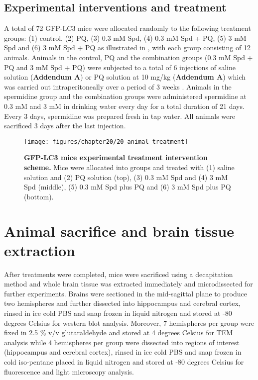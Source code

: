 \subsection{Experimental interventions and treatment}
A total of 72 GFP-LC3 mice were allocated randomly to the following treatment groups: (1) control, (2) PQ, (3) 0.3 mM Spd, (4) 0.3 mM Spd + PQ, (5) 3 mM Spd and (6) 3 mM Spd + PQ as illustrated in  , with each group consisting of 12 animals. Animals in the control, PQ and the combination groups (0.3 mM Spd + PQ and 3 mM Spd + PQ) were subjected to a total of 6 injections of saline solution (\textbf{Addendum A}) or PQ solution at 10 mg/kg (\textbf{Addendum A}) which was carried out intraperitoneally over a period of 3 weeks \citep{Chen2012}. Animals in the spermidine group and the combination groups were administered spermidine at 0.3 mM and 3 mM in drinking water every day for a total duration of 21 days. Every 3 days, spermidine was prepared fresh in tap water. All animals were sacrificed 3 days after the last injection.

\begin{figure}[!htbp]
  \texttt{[image: figures/chapter20/20\_animal\_treatment]}
  \caption[GFP-LC3 mice experimental treatment intervention scheme]{\textbf{GFP-LC3 mice experimental treatment intervention scheme.} Mice were allocated into groups and treated with (1) saline solution and (2) PQ solution (top), (3) 0.3 mM Spd and (4) 3 mM Spd (middle), (5) 0.3 mM Spd plus PQ and (6) 3 mM Spd plus PQ (bottom).}
  \label{fig:20_animal_treatment}
\end{figure}

\section{Animal sacrifice and brain tissue extraction}
After treatments were completed, mice were sacrificed using a decapitation method and whole brain tissue was extracted immediately and microdissected for further experiments. Brains were sectioned in the mid-sagittal plane to produce two hemispheres and further dissected into hippocampus and cerebral cortex, rinsed in ice cold PBS and snap frozen in liquid nitrogen and stored at -80 degrees Celsius for western blot analysis. Moreover, 7 hemispheres per group were fixed in 2.5 \% v/v glutaraldehyde and stored at 4 degrees Celsius for TEM analysis while 4 hemispheres per group were dissected into regions of interest (hippocampus and cerebral cortex), rinsed in ice cold PBS and snap frozen in cold iso-pentane placed in liquid nitrogen and stored at -80 degrees Celsius for fluorescence and light microscopy analysis.

